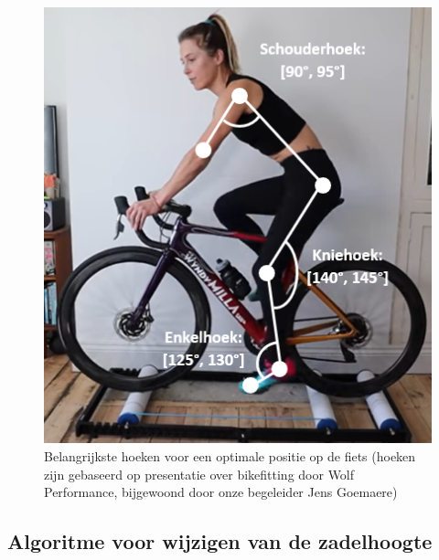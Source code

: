 \documentclass[a4paper,twoside,kulak]{kulakreport}
\begin{document}
\begin{figure}[H]
	\centering
	\includegraphics[width=\textwidth]{bikefit_hoeken_foto}
	\caption{Belangrijkste hoeken voor een optimale positie op de fiets (hoeken zijn gebaseerd op presentatie over bikefitting door Wolf Performance, bijgewoond door onze begeleider Jens Goemaere)}
	\label{fig:bikefit}
\end{figure}

\subsection{Algoritme voor wijzigen van de zadelhoogte}
\end{document}

